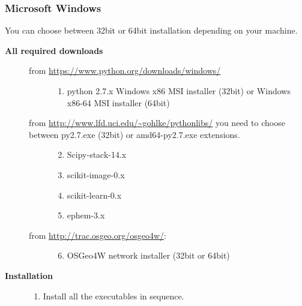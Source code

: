 \documentclass[letterpaper,10pt,english]{sphinxmanual}
\begin{document}
\subsubsection{Microsoft Windows}
\label{install:microsoft-windows}
You can choose between 32bit or 64bit installation depending on your machine.
\begin{description}
\item[{\textbf{All required downloads}}] \leavevmode\begin{description}
\item[{from \href{https://www.python.org/downloads/windows/}{https://www.python.org/downloads/windows/}}] \leavevmode\begin{enumerate}
\item {} 
python 2.7.x Windows x86 MSI installer (32bit) or Windows x86-64 MSI installer (64bit)

\end{enumerate}

\item[{from \href{http://www.lfd.uci.edu/~gohlke/pythonlibs/}{http://www.lfd.uci.edu/\textasciitilde{}gohlke/pythonlibs/} you need to choose between py2.7.exe (32bit) or amd64-py2.7.exe extensions.}] \leavevmode\begin{enumerate}
\setcounter{enumi}{1}
\item {} 
Scipy-stack-14.x

\item {} 
scikit-image-0.x

\item {} 
scikit-learn-0.x

\item {} 
ephem-3.x

\end{enumerate}

\item[{from \href{http://trac.osgeo.org/osgeo4w/}{http://trac.osgeo.org/osgeo4w/}:}] \leavevmode\begin{enumerate}
\setcounter{enumi}{5}
\item {} 
OSGeo4W network installer (32bit or 64bit)

\end{enumerate}

\end{description}

\item[{\textbf{Installation}}] \leavevmode\begin{enumerate}
\item {} 
Install all the executables in sequence.


\end{enumerate}
\end{description}
\end{document}
